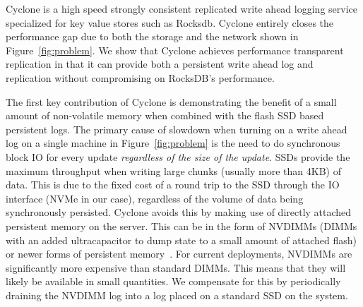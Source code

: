 \documentclass[pageno]{jpaper}
\begin{document}
Cyclone is a high speed strongly consistent replicated write ahead logging
service specialized for key value stores such as Rocksdb. Cyclone entirely
closes the performance gap due to both the storage and the network shown in
Figure~\ref{fig:problem}. We show that Cyclone achieves performance transparent
replication in that it can provide both a persistent write ahead log and
replication without compromising on RocksDB's performance.

The first key contribution of Cyclone is demonstrating the benefit of a small
amount of non-volatile memory when combined with the flash SSD based persistent
logs.  The primary cause of slowdown when turning on a write ahead log on a
single machine in Figure~\ref{fig:problem} is the need to do synchronous block
IO for every update \emph{regardless of the size of the update}. SSDs provide
the maximum throughput when writing large chunks (usually more than 4KB) of
data. This is due to the fixed cost of a round trip to the SSD through the IO
interface (NVMe in our case), regardless of the volume of data being
synchronously persisted. Cyclone avoids this by making use of directly attached
persistent memory on the server. This can be in the form of NVDIMMs (DIMMs with
an added ultracapacitor to dump state to a small amount of attached flash) or
newer forms of persistent memory~\cite{pmfs}. For current deployments, NVDIMMs
are significantly more expensive than standard DIMMs. This means that they will
likely be available in small quantities. We compensate for this by periodically
draining the NVDIMM log into a log placed on a standard SSD on the system.
\end{document}
